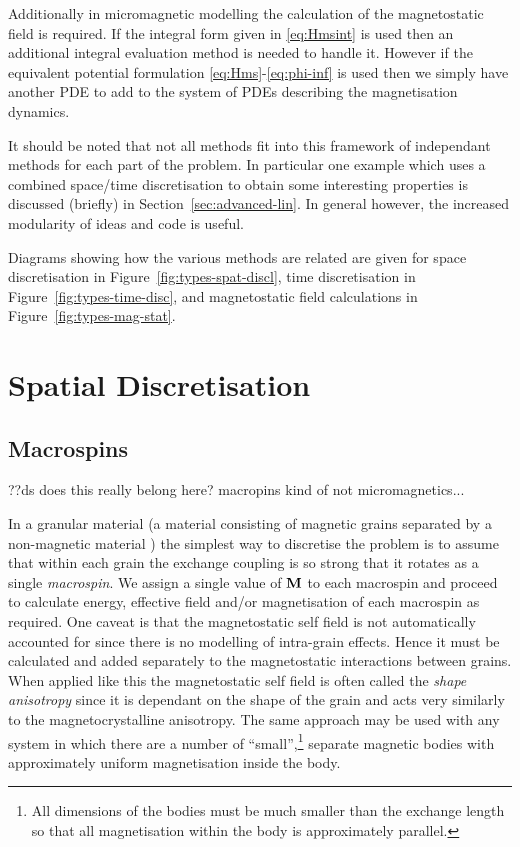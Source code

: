Additionally in micromagnetic modelling the calculation of the magnetostatic field is required.
If the integral form given in \eqref{eq:Hmsint} is used then an additional integral evaluation method is needed to handle it.
However if the equivalent potential formulation \eqref{eq:Hms}-\eqref{eq:phi-inf} is used then we simply have another PDE to add to the system of PDEs describing the magnetisation dynamics.

It should be noted that not all methods fit into this framework of independant methods for each part of the problem.
In particular one example which uses a combined space/time discretisation to obtain some interesting properties is discussed (briefly) in Section~\ref{sec:advanced-lin}.
In general however, the increased modularity of ideas and code is useful.

Diagrams showing how the various methods are related are given for space discretisation in Figure~\ref{fig:types-spat-discl}, time discretisation in Figure~\ref{fig:types-time-disc}, and magnetostatic field calculations in Figure~\ref{fig:types-mag-stat}.

\section{Spatial Discretisation}
\label{sec:spat-discr}

\subsection{Macrospins}
\label{sec:sd-macrospins}

??ds does this really belong here? macropins kind of not micromagnetics...

In a granular material (a material consisting of magnetic grains separated by a non-magnetic material%
) the simplest way to discretise the problem is to assume that within each grain the exchange coupling is so strong that it rotates as a single \emph{macrospin}. We assign a single value of $\mathbf{M}$ to each macrospin and proceed to calculate energy, effective field and/or magnetisation of each macrospin as required. One caveat is that the magnetostatic self field is not automatically accounted for since there is no modelling of intra-grain effects. Hence it must be calculated and added separately to the magnetostatic interactions between grains. When applied like this the magnetostatic self field is often called the \emph{shape anisotropy} since it is dependant on the shape of the grain and acts very similarly to the magnetocrystalline anisotropy. The same approach may be used with any system in which there are a number of ``small'',\footnote{All dimensions of the bodies must be much smaller than the exchange length so that all magnetisation within the body is approximately parallel.} separate magnetic bodies with approximately uniform magnetisation inside the body.

